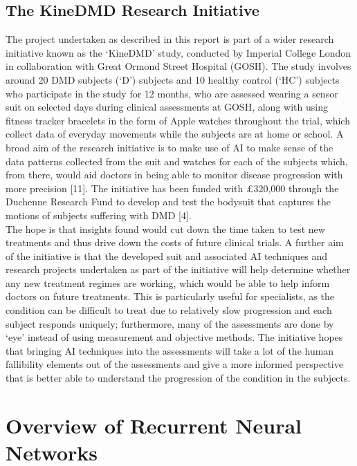 \documentclass[12pt,twoside]{report}
\begin{document}
\section{The KineDMD Research Initiative}

\quad The project undertaken as described in this report is part of a wider research initiative known as the ‘KineDMD’ study, conducted by Imperial College London in collaboration with Great Ormond Street Hospital (GOSH). The study involves around 20 DMD subjects (‘D’) subjects and 10 healthy control (‘HC’) subjects who participate in the study for 12 months, who are assessed wearing a sensor suit on selected days during clinical assessments at GOSH, along with using fitness tracker bracelets in the form of Apple watches throughout the trial, which collect data of everyday movements while the subjects are at home or school. A broad aim of the research initiative is to make use of AI to make sense of the data patterns collected from the suit and watches for each of the subjects which, from there, would aid doctors in being able to monitor disease progression with more precision [11]. The initiative has been funded with £320,000 through the Duchenne Research Fund to develop and test the bodysuit that captures the motions of subjects suffering with DMD [4].\\

\quad The hope is that insights found would cut down the time taken to test new treatments and thus drive down the costs of future clinical trials. A further aim of the initiative is that the developed suit and associated AI techniques and research projects undertaken as part of the initiative will help determine whether any new treatment regimes are working, which would be able to help inform doctors on future treatments. This is particularly useful for specialists, as the condition can be difficult to treat due to relatively slow progression and each subject responds uniquely; furthermore, many of the assessments are done by ‘eye’ instead of using measurement and objective methods. The initiative hopes that bringing AI techniques into the assessments will take a lot of the human fallibility elements out of the assessments and give a more informed perspective that is better able to understand the progression of the condition in the subjects.\\




\chapter{Overview of Recurrent Neural Networks\\~\\}
\end{document}
